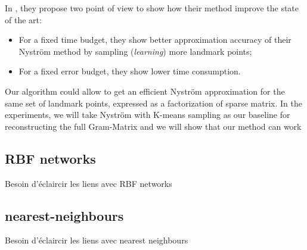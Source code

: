 In \cite{si2016computationally}, they propose two point of view to show how their method improve the state of the art:

\begin{itemize}
 \item For a fixed time budget, they show better approximation accuracy of their Nyström method by sampling (\textit{learning}) more landmark points;
 \item For a fixed error budget, they show lower time consumption.
\end{itemize}

Our algorithm could allow to get an efficient Nyström approximation for the same set of landmark points, expressed as a factorization of sparse matrix. In the experiments, we will take Nyström with K-means sampling as our baseline for reconstructing the full Gram-Matrix and we will show that our method can work

\subsection{RBF networks}

Besoin d'éclaircir les liens avec RBF networks

\subsection{nearest-neighbours}

Besoin d'éclaircir les liens avec nearest neighbours
